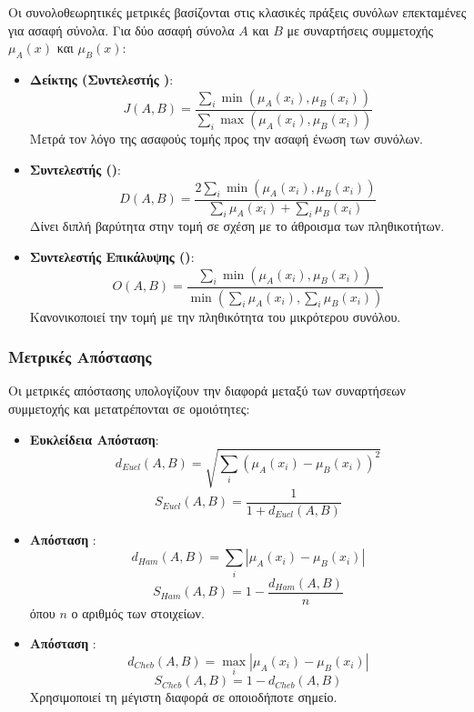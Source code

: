 Οι συνολοθεωρητικές μετρικές βασίζονται στις κλασικές πράξεις συνόλων επεκταμένες για ασαφή σύνολα. Για δύο ασαφή σύνολα \(A\) και \(B\) με συναρτήσεις συμμετοχής \(\mu_A(x)\) και \(\mu_B(x)\):

\begin{itemize}
    \item \textbf{Δείκτης  (Συντελεστής )}:
    \[J(A,B) = \frac{\sum_{i} \min(\mu_A(x_i), \mu_B(x_i))}{\sum_{i} \max(\mu_A(x_i), \mu_B(x_i))}\]
    Μετρά τον λόγο της ασαφούς τομής προς την ασαφή ένωση των συνόλων.
    
    \item \textbf{Συντελεστής  ()}:
    \[D(A,B) = \frac{2\sum_{i} \min(\mu_A(x_i), \mu_B(x_i))}{\sum_{i} \mu_A(x_i) + \sum_{i} \mu_B(x_i)}\]
    Δίνει διπλή βαρύτητα στην τομή σε σχέση με το άθροισμα των πληθικοτήτων.
    
    \item \textbf{Συντελεστής Επικάλυψης ()}:
    \[O(A,B) = \frac{\sum_{i} \min(\mu_A(x_i), \mu_B(x_i))}{\min(\sum_{i} \mu_A(x_i), \sum_{i} \mu_B(x_i))}\]
    Κανονικοποιεί την τομή με την πληθικότητα του μικρότερου συνόλου.
\end{itemize}

\subsubsection{Μετρικές Απόστασης}

Οι μετρικές απόστασης υπολογίζουν την διαφορά μεταξύ των συναρτήσεων συμμετοχής και μετατρέπονται σε ομοιότητες:

\begin{itemize}
    \item \textbf{Ευκλείδεια Απόσταση}:
    \[d_{Eucl}(A,B) = \sqrt{\sum_{i} (\mu_A(x_i) - \mu_B(x_i))^2}\]
    \[S_{Eucl}(A,B) = \frac{1}{1 + d_{Eucl}(A,B)}\]
    
    \item \textbf{Απόσταση }:
    \[d_{Ham}(A,B) = \sum_{i} |\mu_A(x_i) - \mu_B(x_i)|\]
    \[S_{Ham}(A,B) = 1 - \frac{d_{Ham}(A,B)}{n}\]
    όπου \(n\) ο αριθμός των στοιχείων.
    
    \item \textbf{Απόσταση }:
    \[d_{Cheb}(A,B) = \max_{i} |\mu_A(x_i) - \mu_B(x_i)|\]
    \[S_{Cheb}(A,B) = 1 - d_{Cheb}(A,B)\]
    Χρησιμοποιεί τη μέγιστη διαφορά σε οποιοδήποτε σημείο.
\end{itemize}

